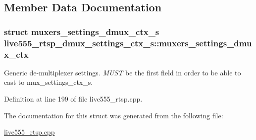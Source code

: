 \subsection{Member Data Documentation}
\subsubsection[{\texorpdfstring{muxers\+\_\+settings\+\_\+dmux\+\_\+ctx}{muxers_settings_dmux_ctx}}]{\setlength{\rightskip}{0pt plus 5cm}struct {\bf muxers\+\_\+settings\+\_\+dmux\+\_\+ctx\+\_\+s} live555\+\_\+rtsp\+\_\+dmux\+\_\+settings\+\_\+ctx\+\_\+s\+::muxers\+\_\+settings\+\_\+dmux\+\_\+ctx}\hypertarget{structlive555__rtsp__dmux__settings__ctx__s_af1c689c7f424a63ac4f5fa09d1832c15}{}\label{structlive555__rtsp__dmux__settings__ctx__s_af1c689c7f424a63ac4f5fa09d1832c15}
Generic de-\/multiplexer settings. {\itshape M\+U\+ST} be the first field in order to be able to cast to mux\+\_\+settings\+\_\+ctx\+\_\+s. 

Definition at line 199 of file live555\+\_\+rtsp.\+cpp.



The documentation for this struct was generated from the following file\+:\begin{DoxyCompactItemize}
\item 
\hyperlink{live555__rtsp_8cpp}{live555\+\_\+rtsp.\+cpp}\end{DoxyCompactItemize}
